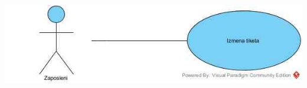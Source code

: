 \documentclass[a4paper]{article}
\begin{document}
\includegraphics[scale=0.5]{IzmenaTiketa.jpg}
\end{document}
